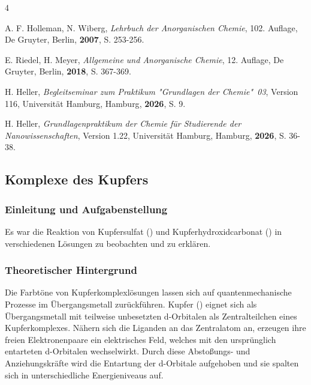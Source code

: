 \documentclass[
	a4paper,										%
	12pt,											%
	twoside,										%
	headsepline,								%
	footsepline,									%
	captions=tableheading,					%
]{scrartcl}
\begin{document}
\begin{thebibliography}{4}		%

						{A. F. Holleman, N. Wiberg}, 
			\textit	{Lehrbuch der Anorganischen Chemie}, 
						{102. Auflage}, 
						{De Gruyter}, 
						{Berlin}, 
			\textbf	{2007}, 
			S.			{253-256}.

						{E. Riedel, H. Meyer}, 
			\textit	{Allgemeine und Anorganische Chemie}, 
						{12. Auflage}, 
						{De Gruyter}, 
						{Berlin}, 
			\textbf	{2018}, 
			S.			{367-369}.

						{H. Heller}, 
			\textit	{Begleitseminar zum Praktikum "Grundlagen der Chemie"\ 03}, 
						{Version 116}, 
						{Universität Hamburg}, 
						{Hamburg}, 
			\textbf	{2026}, 
			S.			{9}.
	
						{H. Heller}, 
			\textit	{Grundlagenpraktikum der Chemie für Studierende der Nanowissenschaften}, 
						{Version 1.22}, 
						{Universität Hamburg}, 
						{Hamburg}, 
			\textbf	{2026}, 
			S.			{36-38}.

\end{thebibliography}

\newpage

\setcounter{subsection}{2}							%
\setcounter{secnumdepth}{4}
	
\subsection{Komplexe des Kupfers}

\subsubsection{Einleitung und Aufgabenstellung}

	Es war die Reaktion von Kupfersulfat () und Kupferhydroxidcarbonat () in verschiedenen Lösungen zu beobachten und zu erklären.

\subsubsection{Theoretischer Hintergrund}

	Die Farbtöne von Kupferkomplexlösungen lassen sich auf quantenmechanische Prozesse im Übergangsmetall zurückführen.
	Kupfer () eignet sich als Übergangsmetall mit teilweise unbesetzten d-Orbitalen als Zentralteilchen eines Kupferkomplexes.
	Nähern sich die Liganden an das Zentralatom an, erzeugen ihre freien Elektronenpaare ein elektrisches Feld, welches mit den ursprünglich entarteten d-Orbitalen wechselwirkt.
	Durch diese Abstoßungs- und Anziehungskräfte wird die Entartung der d-Orbitale aufgehoben und sie spalten sich in unterschiedliche Energieniveaus auf.
\end{document}
